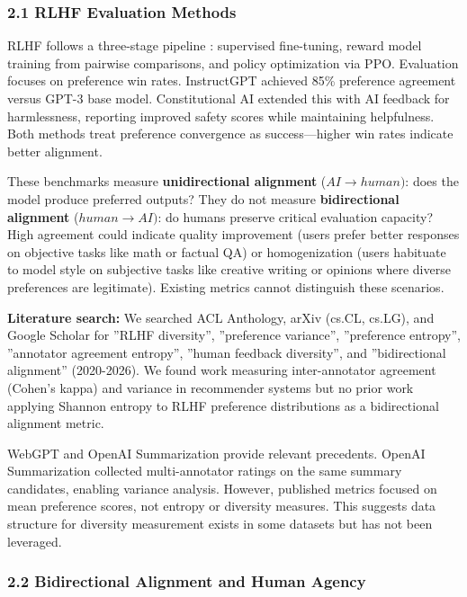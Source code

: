 
\subsubsection{2.1 RLHF Evaluation Methods}

RLHF follows a three-stage pipeline \citep{ouyang2022instructgpt}: supervised fine-tuning, reward model training from pairwise comparisons, and policy optimization via PPO. Evaluation focuses on preference win rates. InstructGPT achieved 85\% preference agreement versus GPT-3 base model. Constitutional AI \citep{bai2022constitutional} extended this with AI feedback for harmlessness, reporting improved safety scores while maintaining helpfulness. Both methods treat preference convergence as success---higher win rates indicate better alignment.

These benchmarks measure \textbf{unidirectional alignment} ($AI\rightarrow human)$: does the model produce preferred outputs? They do not measure \textbf{bidirectional alignment} ($human\rightarrow AI)$: do humans preserve critical evaluation capacity? High agreement could indicate quality improvement (users prefer better responses on objective tasks like math or factual QA) or homogenization (users habituate to model style on subjective tasks like creative writing or opinions where diverse preferences are legitimate). Existing metrics cannot distinguish these scenarios.

\textbf{Literature search:} We searched ACL Anthology, arXiv (cs.CL, cs.LG), and Google Scholar for ''RLHF diversity'', ''preference variance'', ''preference entropy'', ''annotator agreement entropy'', ''human feedback diversity'', and ''bidirectional alignment'' (2020-2026). We found work measuring inter-annotator agreement (Cohen's kappa) and variance in recommender systems but no prior work applying Shannon entropy to RLHF preference distributions as a bidirectional alignment metric.

WebGPT \citep{nakano2021webgpt} and OpenAI Summarization \citep{stiennon2020summarize} provide relevant precedents. OpenAI Summarization collected multi-annotator ratings on the same summary candidates, enabling variance analysis. However, published metrics focused on mean preference scores, not entropy or diversity measures. This suggests data structure for diversity measurement exists in some datasets but has not been leveraged.

\subsubsection{2.2 Bidirectional Alignment and Human Agency}

